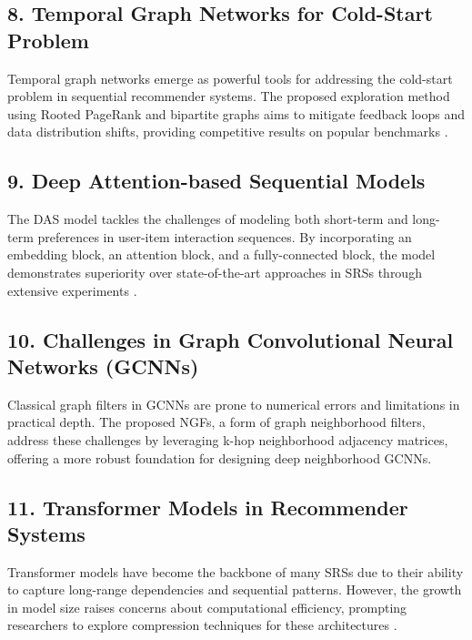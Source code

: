 \documentclass[journal]{IEEEtran}
\begin{document}
\subsection*{8. Temporal Graph Networks for Cold-Start Problem}

Temporal graph networks emerge as powerful tools for addressing the cold-start problem in sequential recommender systems. The 
proposed exploration method using Rooted PageRank and bipartite graphs aims to mitigate feedback loops and data distribution shifts, 
providing competitive results on popular benchmarks \cite{9963919}.

\subsection*{9. Deep Attention-based Sequential Models}

The DAS model tackles the challenges of modeling both short-term and long-term preferences in user-item interaction sequences. 
By incorporating an embedding block, an attention block, and a fully-connected block, the model demonstrates superiority over 
state-of-the-art approaches in SRSs through extensive experiments \cite{9123874}.

\subsection*{10. Challenges in Graph Convolutional Neural Networks (GCNNs)}

Classical graph filters in GCNNs are prone to numerical errors and limitations in practical depth. The proposed NGFs, 
a form of graph neighborhood filters, address these challenges by leveraging k-hop neighborhood adjacency matrices, offering a 
more robust foundation for designing deep neighborhood GCNNs.

\subsection*{11. Transformer Models in Recommender Systems}

Transformer models have become the backbone of many SRSs due to their ability to capture long-range dependencies and sequential 
patterns. However, the growth in model size raises concerns about computational efficiency, prompting researchers to explore 
compression techniques for these architectures \cite{LI2024122260}.


\end{document}
